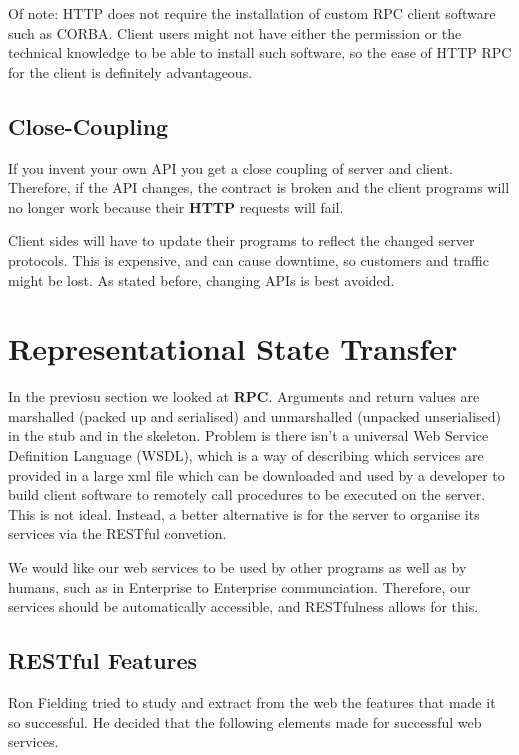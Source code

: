 \documentclass[11pt]{article}
\begin{document}
Of note: HTTP does not require the installation of custom RPC client software such as CORBA. Client users might not have either the permission or the technical knowledge to be able to install such software, so the ease of HTTP RPC for the client is definitely advantageous.

\subsection{Close-Coupling}

If you invent your own API you get a close coupling of server and client. Therefore, if the API changes, the contract is broken and the client programs will no longer work because their \textbf{HTTP} requests will fail.

Client sides will have to update their programs to reflect the changed server protocols. This is expensive, and can cause downtime, so customers and traffic might be lost. As stated before, changing APIs is best avoided.




\section{Representational State Transfer}
\label{sec:REST}

In the previosu section we looked at \textbf{RPC}. Arguments and return values are marshalled (packed up and serialised) and unmarshalled (unpacked unserialised) in the stub and in the skeleton. Problem is there isn’t a universal Web Service Definition Language (WSDL), which is a way of describing which services are provided in a large xml file which can be downloaded and used by a developer to build client software to remotely call procedures to be executed on the server. This is not ideal. Instead, a better alternative is for the server to organise its services via the RESTful convetion.

We would like our web services to be used by other programs as well as by humans, such as in Enterprise to Enterprise communciation. Therefore, our services should be automatically accessible, and RESTfulness allows for this.

\subsection{RESTful Features}
Ron Fielding tried to study and extract from the web the features that made it so successful. He decided that the following elements made for successful web services.
\end{document}
